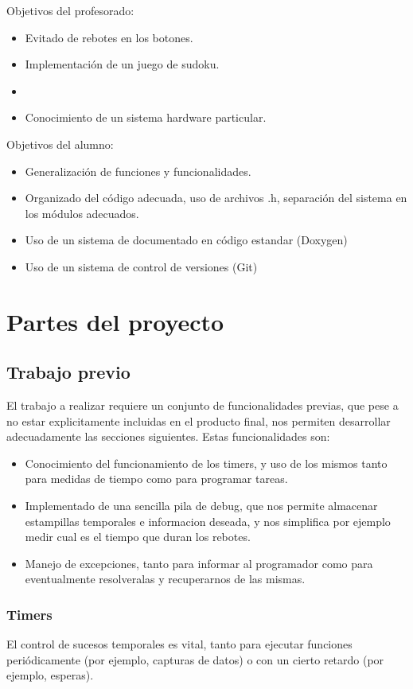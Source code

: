 \documentclass[12pt,letterpaper]{article}
\begin{document}
Objetivos del profesorado:
\begin{itemize}
  \item Evitado de rebotes en los botones.
  \item Implementación de un juego de sudoku.
  \item
  \item Conocimiento de un sistema hardware particular.
\end{itemize}

Objetivos del alumno:
\begin{itemize}
  \item Generalización de funciones y funcionalidades.
  \item Organizado del código adecuada, uso de archivos .h, separación
    del sistema en los módulos adecuados.
  \item Uso de un sistema de documentado en código estandar (Doxygen)
  \item Uso de un sistema de control de versiones (Git)
\end{itemize}


\section{Partes del proyecto}
\subsection{Trabajo previo}
\label{subsec:previous}
El trabajo a realizar requiere un conjunto de funcionalidades previas,
que pese a no estar explicitamente incluidas en el producto final, nos
permiten desarrollar adecuadamente las secciones siguientes. Estas
funcionalidades son:
\begin{itemize}
  \item Conocimiento del funcionamiento de los timers, y uso de los
    mismos tanto para medidas de tiempo como para programar tareas.
  \item Implementado de una sencilla pila de debug, que nos permite
    almacenar estampillas temporales e informacion deseada, y nos
    simplifica por ejemplo medir cual es el tiempo que duran los
    rebotes.
  \item Manejo de excepciones, tanto para informar al programador como
    para eventualmente resolveralas y recuperarnos de las mismas.
\end{itemize}

\subsubsection{Timers}
\label{subsubsec:timers}
El control de sucesos temporales es vital, tanto para ejecutar
funciones periódicamente (por ejemplo, capturas de datos) o con un
cierto retardo (por ejemplo, esperas).
\end{document}
